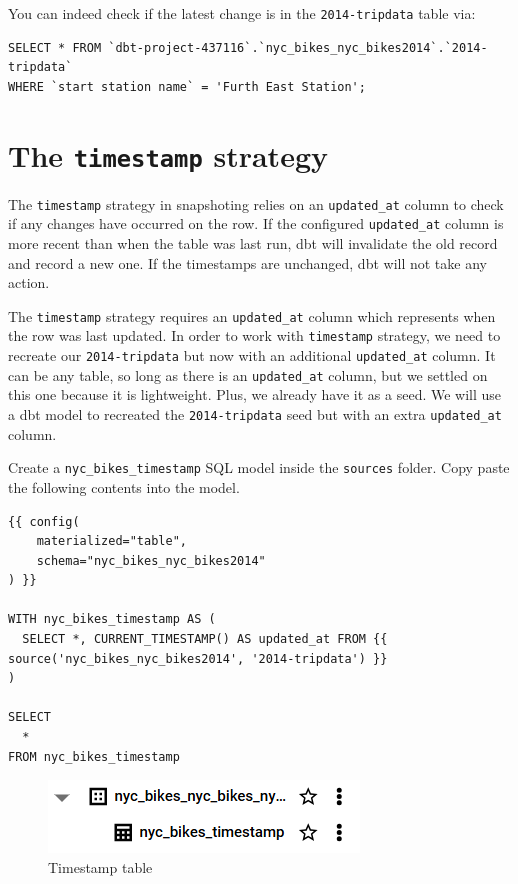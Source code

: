 \documentclass[
]{book}
\begin{document}
You can indeed check if the latest change is in the \texttt{2014-tripdata} table via:

\begin{verbatim}
SELECT * FROM `dbt-project-437116`.`nyc_bikes_nyc_bikes2014`.`2014-tripdata`
WHERE `start station name` = 'Furth East Station';
\end{verbatim}

\hypertarget{the-timestamp-strategy}{%
\section{\texorpdfstring{The \texttt{timestamp} strategy}{The timestamp strategy}}\label{the-timestamp-strategy}}

The \texttt{timestamp} strategy in snapshoting relies on an \texttt{updated\_at} column to check if any changes have occurred on the row. If the configured \texttt{updated\_at} column is more recent than when the table was last run, dbt will invalidate the old record and record a new one. If the timestamps are unchanged, dbt will not take any action.

The \texttt{timestamp} strategy requires an \texttt{updated\_at} column which represents when the row was last updated. In order to work with \texttt{timestamp} strategy, we need to recreate our \texttt{2014-tripdata} but now with an additional \texttt{updated\_at} column. It can be any table, so long as there is an \texttt{updated\_at} column, but we settled on this one because it is lightweight. Plus, we already have it as a seed. We will use a dbt model to recreated the \texttt{2014-tripdata} seed but with an extra \texttt{updated\_at} column.

Create a \texttt{nyc\_bikes\_timestamp} SQL model inside the \texttt{sources} folder. Copy paste the following contents into the model.

\begin{verbatim}
{{ config(
    materialized="table",
    schema="nyc_bikes_nyc_bikes2014"
) }}

WITH nyc_bikes_timestamp AS (
  SELECT *, CURRENT_TIMESTAMP() AS updated_at FROM {{ source('nyc_bikes_nyc_bikes2014', '2014-tripdata') }}
)

SELECT
  *
FROM nyc_bikes_timestamp
\end{verbatim}

\begin{figure}
\centering
\includegraphics{./images/timestamp_table.png}
\caption{Timestamp table}
\end{figure}
\end{document}
